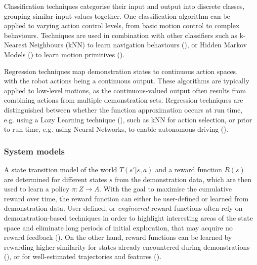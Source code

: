 Classification techniques categorise their input and output into discrete classes, grouping similar input values together. One classification algorithm can be applied to varying action control levels, from basic motion control to complex behaviours. Techniques are used in combination with other classifiers such as k-Nearest Neighbours (kNN) to learn navigation behaviours (\cite{saunders2006teaching}), or Hidden Markov Models (\cite{hovland1996skill}) to learn motion primitives (\cite{rybski1999interactive}).

Regression techniques map demonstration states to continuous action spaces, with the robot actions being a continuous output. These algorithms are typically applied to low-level motions, as the continuous-valued output often results from combining actions from multiple demonstration sets. Regression techniques are distinguished between whether the function approximation occurs at run time, e.g. using a Lazy Learning technique (\cite{atkeson1997locally}), such as kNN for action selection, or prior to run time, e.g. using Neural Networks, to enable autonomous driving (\cite{pomerleau1991efficient}).

\subsubsection{System models}
A state transition model of the world $T(s'|s, a)$ and a reward function $R(s)$ are determined for different states $s$ from the demonstration data, which are then used to learn a policy $\pi : Z \rightarrow A$. With the goal to maximise the cumulative reward over time, the reward function can either be user-defined or learned from demonstration data.
User-defined, or \textit{engineered} reward functions often rely on demonstration-based techniques in order to highlight interesting areas of the state space and eliminate long periods of initial exploration, that may acquire no reward feedback (\cite{smart2002effective}).
On the other hand, reward functions can be learned by rewarding higher similarity for states already encountered during demonstrations (\cite{atkeson1997robot}), or for well-estimated trajectories and features (\cite{abbeel2004apprenticeship}).
